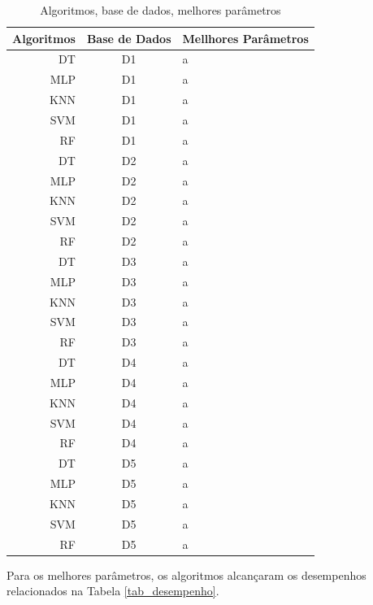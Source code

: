 \documentclass[12pt]{article}
\begin{document}
\begin{table}[h!]
  \begin{center}
    \caption{Algoritmos, base de dados, melhores parâmetros}
    \label{tab_parametros}
    \begin{tabular}{r|c|l}
      \textbf{Algoritmos} & \textbf{Base de Dados} & \textbf{ Mellhores Parâmetros} \\
      \hline
      DT                  & D1 & a  \\
      MLP                 & D1 & a  \\
      KNN                 & D1 & a  \\
      SVM                 & D1 & a  \\
      RF                  & D1 & a  \\
      DT                  & D2 & a  \\
      MLP                 & D2 & a  \\
      KNN                 & D2 & a  \\
      SVM                 & D2 & a  \\
      RF                  & D2 & a  \\
      DT                  & D3 & a  \\
      MLP                 & D3 & a  \\
      KNN                 & D3 & a  \\
      SVM                 & D3 & a  \\
      RF                  & D3 & a  \\
      DT                  & D4 & a  \\
      MLP                 & D4 & a  \\
      KNN                 & D4 & a  \\
      SVM                 & D4 & a  \\
      RF                  & D4 & a  \\
      DT                  & D5 & a  \\
      MLP                 & D5 & a  \\
      KNN                 & D5 & a  \\
      SVM                 & D5 & a  \\
      RF                  & D5 & a  \\
    \end{tabular}
  \end{center}
\end{table}

Para os melhores parâmetros, os algoritmos alcançaram os desempenhos relacionados na Tabela \ref{tab_desempenho}.
\end{document}
